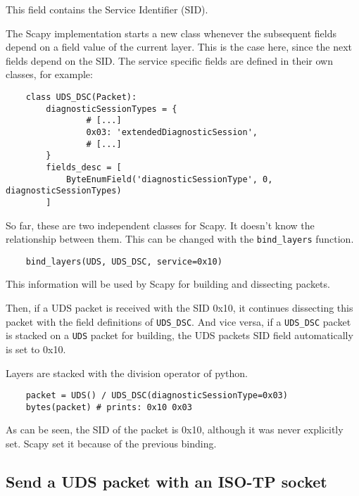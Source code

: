 This field contains the Service Identifier (SID).

The Scapy implementation starts a new class whenever the subsequent fields depend on a field value of the current layer. This is the case here, since the next fields depend on the SID. The service specific fields are defined in their own classes, for example:

\begin{samepage}
\begin{verbatim}
    class UDS_DSC(Packet):
        diagnosticSessionTypes = {
                # [...]
                0x03: 'extendedDiagnosticSession',
                # [...]
        }
        fields_desc = [
            ByteEnumField('diagnosticSessionType', 0,  diagnosticSessionTypes)
        ]
\end{verbatim}
\end{samepage}

So far, these are two independent classes for Scapy. It doesn't know the relationship between them. This can be changed with the \texttt{bind_layers} function.

\begin{verbatim}
    bind_layers(UDS, UDS_DSC, service=0x10)
\end{verbatim}

This information will be used by Scapy for building and dissecting packets.

Then, if a UDS packet is received with the SID 0x10, it continues dissecting this packet with the field definitions of \texttt{UDS_DSC}. And vice versa, if a \texttt{UDS_DSC} packet is stacked on a \texttt{UDS} packet for building, the UDS packets SID field automatically is set to 0x10.

Layers are stacked with the division operator of python.

\begin{samepage}
\begin{verbatim}
    packet = UDS() / UDS_DSC(diagnosticSessionType=0x03)
    bytes(packet) # prints: 0x10 0x03
\end{verbatim}
\end{samepage}

As can be seen, the SID of the packet is 0x10, although it was never explicitly set. Scapy set it because of the previous binding.


\subsection{Send a UDS packet with an ISO-TP socket}

